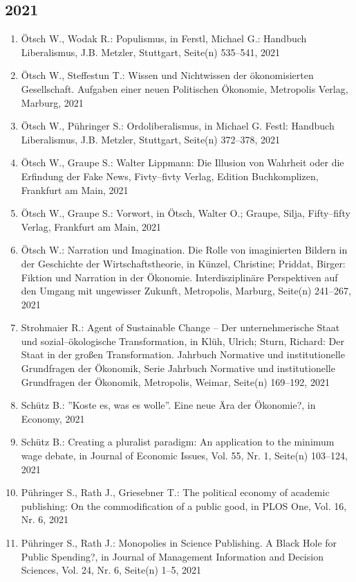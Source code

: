 \subsection*{2021}
\begin{enumerate}
    	 \item Ötsch W., Wodak R.: Populismus, in Ferstl, Michael G.: Handbuch Liberalismus, J.B. Metzler, Stuttgart, Seite(n) 535--541, 2021
	 \item Ötsch W., Steffestun T.: Wissen und Nichtwissen der ökonomisierten Gesellschaft. Aufgaben einer neuen Politischen Ökonomie, Metropolis Verlag, Marburg, 2021
	 \item Ötsch W., Pühringer S.: Ordoliberalismus, in Michael G. Festl: Handbuch Liberalismus, J.B. Metzler, Stuttgart, Seite(n) 372--378, 2021
	 \item Ötsch W., Graupe S.: Walter Lippmann: Die Illusion von Wahrheit oder die Erfindung der Fake News, Fivty--fivty Verlag, Edition Buchkomplizen, Frankfurt am Main, 2021
	 \item Ötsch W., Graupe S.: Vorwort, in Ötsch, Walter O.; Graupe, Silja, Fifty--fifty Verlag, Frankfurt am Main, 2021
	 \item Ötsch W.: Narration und Imagination. Die Rolle von imaginierten Bildern in der Geschichte der Wirtschaftstheorie, in Künzel, Christine; Priddat, Birger: Fiktion und Narration in der Ökonomie. Interdisziplinäre Perspektiven auf den Umgang mit ungewisser Zukunft, Metropolis, Marburg, Seite(n) 241--267, 2021
	 \item Strohmaier R.: Agent of Sustainable Change -- Der unternehmerische Staat und sozial--ökologische Transformation, in Klüh, Ulrich; Sturn, Richard: Der Staat in der großen Transformation. Jahrbuch Normative und institutionelle Grundfragen der Ökonomik, Serie Jahrbuch Normative und institutionelle Grundfragen der Ökonomik, Metropolis, Weimar, Seite(n) 169--192, 2021
	 \item Schütz B.: ''Koste es, was es wolle''. Eine neue Ära der Ökonomie?, in Economy, 2021
	 \item Schütz B.: Creating a pluralist paradigm: An application to the minimum wage debate, in Journal of Economic Issues, Vol. 55, Nr. 1, Seite(n) 103--124, 2021
	 \item Pühringer S., Rath J., Griesebner T.: The political economy of academic publishing: On the commodification of a public good, in PLOS One, Vol. 16, Nr. 6, 2021
	 \item Pühringer S., Rath J.: Monopolies in Science Publishing. A Black Hole for Public Spending?, in Journal of Management Information and Decision Sciences, Vol. 24, Nr. 6, Seite(n) 1--5, 2021

\end{enumerate}
